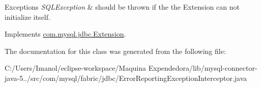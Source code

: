 \begin{DoxyExceptions}{Exceptions}
{\em S\+Q\+L\+Exception} & should be thrown if the the Extension can not initialize itself. \\
\hline
\end{DoxyExceptions}


Implements \mbox{\hyperlink{interfacecom_1_1mysql_1_1jdbc_1_1_extension_a79427811058193260bd4df0c38414e88}{com.\+mysql.\+jdbc.\+Extension}}.



The documentation for this class was generated from the following file\+:\begin{DoxyCompactItemize}
\item 
C\+:/\+Users/\+Imanol/eclipse-\/workspace/\+Maquina Expendedora/lib/mysql-\/connector-\/java-\/5../src/com/mysql/fabric/jdbc/Error\+Reporting\+Exception\+Interceptor.\+java\end{DoxyCompactItemize}

